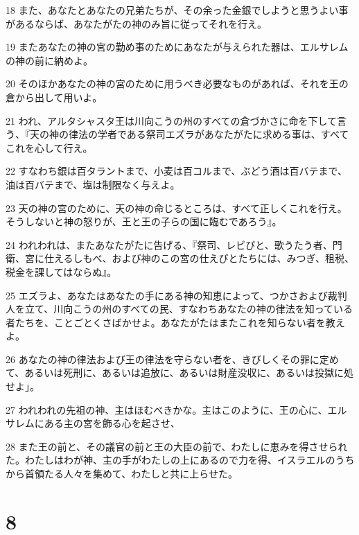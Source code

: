 \par 18 また、あなたとあなたの兄弟たちが、その余った金銀でしようと思うよい事があるならば、あなたがたの神のみ旨に従ってそれを行え。
\par 19 またあなたの神の宮の勤め事のためにあなたが与えられた器は、エルサレムの神の前に納めよ。
\par 20 そのほかあなたの神の宮のために用うべき必要なものがあれば、それを王の倉から出して用いよ。
\par 21 われ、アルタシャスタ王は川向こうの州のすべての倉づかさに命を下して言う、『天の神の律法の学者である祭司エズラがあなたがたに求める事は、すべてこれを心して行え。
\par 22 すなわち銀は百タラントまで、小麦は百コルまで、ぶどう酒は百バテまで、油は百バテまで、塩は制限なく与えよ。
\par 23 天の神の宮のために、天の神の命じるところは、すべて正しくこれを行え。そうしないと神の怒りが、王と王の子らの国に臨むであろう』。
\par 24 われわれは、またあなたがたに告げる、『祭司、レビびと、歌うたう者、門衛、宮に仕えるしもべ、および神のこの宮の仕えびとたちには、みつぎ、租税、税金を課してはならぬ』。
\par 25 エズラよ、あなたはあなたの手にある神の知恵によって、つかさおよび裁判人を立て、川向こうの州のすべての民、すなわちあなたの神の律法を知っている者たちを、ことごとくさばかせよ。あなたがたはまたこれを知らない者を教えよ。
\par 26 あなたの神の律法および王の律法を守らない者を、きびしくその罪に定めて、あるいは死刑に、あるいは追放に、あるいは財産没収に、あるいは投獄に処せよ」。
\par 27 われわれの先祖の神、主はほむべきかな。主はこのように、王の心に、エルサレムにある主の宮を飾る心を起させ、
\par 28 また王の前と、その議官の前と王の大臣の前で、わたしに恵みを得させられた。わたしはわが神、主の手がわたしの上にあるので力を得、イスラエルのうちから首領たる人々を集めて、わたしと共に上らせた。

\chapter{8}

